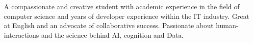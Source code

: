 


\begin{cvparagraph}
	
	A compassionate and creative student with academic experience in the field of computer science and years of developer experience within the IT industry. Great at English and an advocate of collaborative success.
	Passionate about human-interactions and the science behind AI, cognition and Data.
\end{cvparagraph}